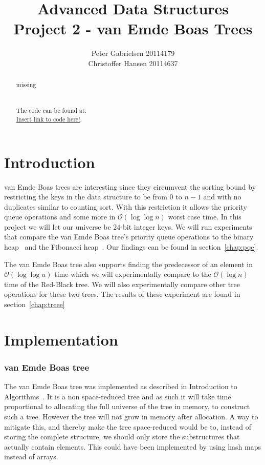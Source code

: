 \documentclass[a4paper,oneside,article,11pt]{memoir}
\title{Advanced Data Structures \\ Project 2 - van Emde Boas Trees}
\author{Peter Gabrielsen 20114179 \\
Christoffer Hansen 20114637}
\begin{document}
\begin{titlingpage}
\clearpage

\maketitle
\thispagestyle{empty}

\begin{abstract}
missing
\\
\\
\\
The code can be found at: \\\url{Insert link to code here!}.
\end{abstract}
\end{titlingpage}

\pagebreak

\tableofcontents

\pagebreak

\chapter{Introduction}
van Emde Boas trees are interesting since they circumvent the sorting bound by restricting the keys in the data structure to be from $0$ to $n-1$ and with no duplicates similar to counting sort. With this restriction it allows the priority queue operations and some more in $\mathcal{O}(\log\log n)$ worst case time. In this project we will let our universe be 24-bit integer keys. We will run experiments that compare the van Emde Boas tree's priority queue operations to the binary heap~\cite{williams} and the Fibonacci heap~\cite{fred87}. Our findings can be found in section~\ref{chap:pqe}.

The van Emde Boas tree also supports finding the predecessor of an element in $\mathcal{O}(\log\log u)$ time which we will experimentally compare to the $\mathcal{O}(\log n)$ time of the Red-Black tree. We will also experimentally compare other tree operations for these two trees. The results of these experiment are found in section~\ref{chap:treee}
\chapter{Implementation}
\label{cpt:implementation}


\subsection{van Emde Boas tree}
The van Emde Boas tree was implemented as described in Introduction to Algorithms~\cite{clrs}. It is a non space-reduced tree and as such it will take time proportional to allocating the full universe of the tree in memory, to construct such a tree. However the tree will not grow in memory after allocation. A way to mitigate this, and thereby make the tree space-reduced would be to, instead of storing the complete structure, we should only store the substructures that actually contain elements. This could have been implemented by using hash maps instead of arrays.
\end{document}
